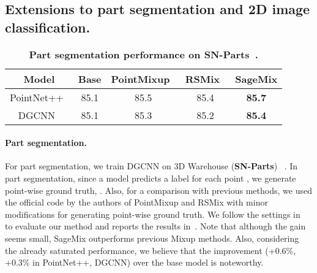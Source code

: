 \documentclass{article}
\begin{document}
\subsection{Extensions to part segmentation and 2D image classification.}
\label{sec:exp.3}

\begin{table}[t!]
  \centering 
  \setlength{\tabcolsep}{8pt}
\renewcommand{\arraystretch}{1.1}
  \caption{\textbf{Part segmentation performance on SN-Parts~\cite{xu2021image2point}.}}
  \label{table:part} 
  \begin{tabular}{c|ccc|c}
  \toprule
  \textbf{Model} & Base & PointMixup~\cite{chen2020pointmixup} & RSMix~\cite{lee2021regularization} & \textbf{SageMix} \\
  \midrule
  \midrule 
  PointNet++~\cite{qi2017pointnet++}& 85.1 & 85.5 & 85.4 & \textbf{85.7}\\
  DGCNN~\cite{wang2019dynamic}& 85.1 & 85.3 & 85.2 & \textbf{85.4}\\


  \bottomrule
  \end{tabular}
  
  
\end{table} 

 \paragraph{Part segmentation.} For part segmentation, we train DGCNN on 3D Warehouse (\textbf{SN-Parts}) ~\cite{3dwarehouse,xu2021image2point}. In part segmentation, since a model predicts a label for each point , we generate point-wise ground truth, \ie . Also, for a comparison with previous methods, we used the official code by the authors of PointMixup and RSMix with minor modifications for generating point-wise ground truth.
We follow the settings in~\cite{qi2017pointnet++, wang2019dynamic} to evaluate our method and reports the results in~. Note that although the gain seems small, SageMix outperforms previous Mixup methods. Also, considering the already saturated performance, we believe that the improvement (+0.6\%, +0.3\% in PointNet++, DGCNN) over the base model is noteworthy. 
\end{document}

